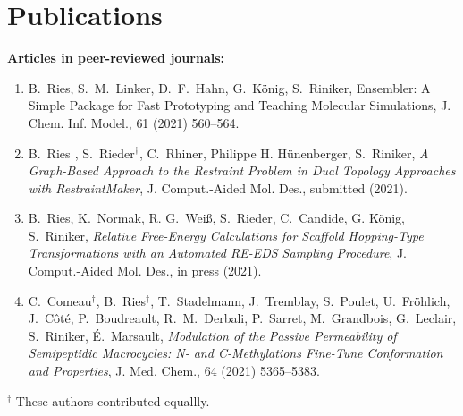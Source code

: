 \chapter{Publications}
\noindent \textbf{Articles in peer-reviewed journals:}
\begin{enumerate}
\item B.\ Ries, S.\ M.\ Linker, D.\ F.\ Hahn, G.\ K\"onig, S.\ Riniker, Ensembler: A Simple Package for Fast Prototyping and Teaching Molecular Simulations, {J. Chem. Inf. Model.}, {61} (2021) 560--564.

\item B.\ Ries$^\dag$, S.\ Rieder$^\dag$, C.\ Rhiner, Philippe H. H\"unenberger, S.\ Riniker, \textit{A Graph-Based Approach to the Restraint Problem in Dual Topology Approaches with RestraintMaker}, {J. Comput.-Aided Mol. Des.}, submitted (2021).

\item B.\ Ries, K.\ Normak, R. G.\ Wei\ss, S.\ Rieder, C.\ Candide, G. K\"onig, S.\ Riniker, \textit{Relative Free-Energy Calculations for Scaffold Hopping-Type Transformations with an Automated RE-EDS Sampling Procedure}, {J. Comput.-Aided Mol. Des.}, in press (2021).

\item C.\ Comeau$^\dag$, B.\ Ries$^\dag$, T.\ Stadelmann, J.\ Tremblay, S.\ Poulet, U.\ Fröhlich, J.\ Côté, P.\ Boudreault, R.\ M.\ Derbali, P.\ Sarret, M.\ Grandbois, G.\ Leclair, S.\ Riniker, \'E.\ Marsault, \textit{Modulation of the Passive Permeability of Semipeptidic Macrocycles: N- and C-Methylations Fine-Tune Conformation and Properties}, {J. Med. Chem.}, {64} (2021) 5365--5383.
\end{enumerate}
\noindent $^\dag$ These authors contributed equallly. \\

